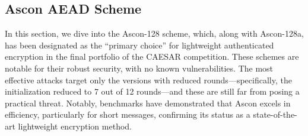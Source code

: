 

\subsection{Ascon AEAD Scheme}
In this section, we dive into the Ascon-128 scheme, which, along with Ascon-128a, has been designated as the “primary choice” for lightweight authenticated encryption in the final portfolio of the CAESAR competition. These schemes are notable for their robust security, with no known vulnerabilities. The most effective attacks target only the versions with reduced rounds—specifically, the initialization reduced to 7 out of 12 rounds—and these are still far from posing a practical threat. Notably, benchmarks have demonstrated that Ascon excels in efficiency, particularly for short messages, confirming its status as a state-of-the-art lightweight encryption method. \cite[Chapter 1]{Ascon-v1.2}


